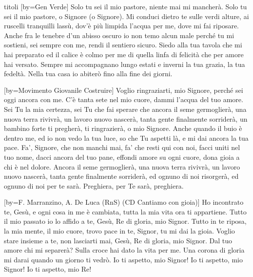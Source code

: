 \begin{songs}{titoli}
[by={Gen Verde}]
\beginchorus
Solo tu sei il mio pastore,
niente mai mi mancherà.
Solo tu sei il mio pastore, o Signore (o Signore).
\endchorus
\beginverse
Mi conduci dietro te sulle verdi alture,
ai ruscelli tranquilli lassù,
dov'è più limpida l'acqua per me,
dove mi fai riposare.
\endverse
\beginverse
Anche fra le tenebre d'un abisso oscuro
io non temo alcun male perché
tu mi sostieni, sei sempre con me,
rendi il sentiero sicuro.
\endverse
\beginverse
Siedo alla tua tavola che mi hai preparato
ed il calice è colmo per me
di quella linfa di felicità
che per amore hai versato.
\endverse
\beginverse
Sempre mi accompagnano lungo estati e inverni
la tua grazia, la tua fedeltà.
Nella tua casa io abiterò
fino alla fine dei giorni.
\endverse
\endsong

[by={Movimento Giovanile Costruire}]
\beginverse
Voglio ringraziarti, mio Signore, perché sei oggi ancora con me.
C'è tanta sete nel mio cuore, dammi l'acqua del tuo amore.
Sei Tu la mia certezza, sei Tu che fai sperare che
ancora il seme germoglierà, una nuova terra rivivrà,
un lavoro nuovo nascerà, tanta gente finalmente sorriderà,
un bambino forte ti pregherà, ti ringrazierà, o mio Signore.
\endverse
\beginverse
Anche quando il buio è dentro me, ed io non vedo la tua luce,
so che Tu aspetti là, e mi dai ancora la tua pace.
Fa', Signore, che non manchi mai, fa' che resti qui con noi,
facci uniti nel tuo nome, dacci ancora del tuo pane,
effondi amore su ogni cuore, dona gioia a chi è nel dolore.
Ancora il seme germoglierà, una nuova terra rivivrà,
un lavoro nuovo nascerà, tanta gente finalmente sorriderà,
ed ognuno di noi risorgerà, ed ognuno di noi per te sarà.
\endverse
\beginchorus
Preghiera, per Te sarà, preghiera. 
\endchorus
\endsong

[by={F. Marranzino, A. De Luca (RnS) (CD Cantiamo con gioia)}]
\beginverse
Ho incontrato te, Gesù, e ogni cosa in me è cambiata,
tutta la mia vita ora ti appartiene.
Tutto il mio passato io lo affido a te,
Gesù, Re di gloria, mio Signor.
\endverse
\beginchorus
Tutto in te riposa, la mia mente, il mio cuore,
trovo pace in te, Signor, tu mi dai la gioia.
Voglio stare insieme a te, non lasciarti mai,
Gesù, Re di gloria, mio Signor.
\endchorus
\beginverse
Dal tuo amore chi mi separerà? Sulla croce hai dato la vita per me.
Una corona di gloria mi darai quando un giorno ti vedrò.
\endverse
\beginverse*
Io ti aspetto, mio Signor!
Io ti aspetto, mio Signor!
Io ti aspetto, mio Re!
\endverse
\endsong


\end{songs}

